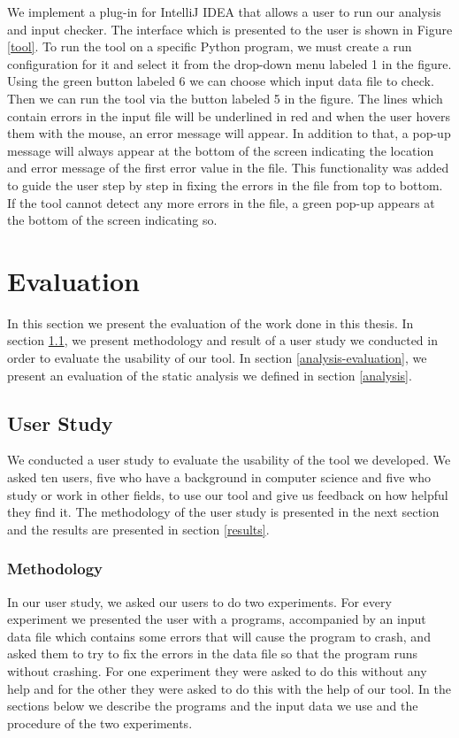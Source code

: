 \documentclass[10pt]{report}
\begin{document}
We implement a plug-in for IntelliJ IDEA that allows a user to run our analysis and input checker. The interface which is presented to the user is shown in Figure \ref{tool}. To run the tool on a specific Python program, we must create a run configuration for it and select it from the drop-down menu labeled 1 in the figure. Using the green button labeled 6 we can choose which input data file to check. Then we can run the tool via the button labeled 5 in the figure. The lines which contain errors in the input file will be underlined in red and when the user hovers them with the mouse, an error message will appear. In addition to that, a pop-up message will always appear at the bottom of the screen indicating the location and error message of the first error value in the file. This functionality was added to guide the user step by step in fixing the errors in the file from top to bottom. If the tool cannot detect any more errors in the file, a green pop-up appears at the bottom of the screen indicating so. 
  

\chapter{Evaluation}

In this section we present the evaluation of the work done in this thesis. In section \ref{user-study}, we present methodology and result of a user study we conducted in order to evaluate the usability of our tool. In section \ref{analysis-evaluation}, we present an evaluation of the static analysis we defined in section \ref{analysis}. 

\section{User Study} \label{user-study}
We conducted a user study to evaluate the usability of the tool we developed. We asked ten users, five who have a background in computer science and five who study or work in other fields, to use our tool and give us feedback on how helpful they find it. The methodology of the user study is presented in the next section and the results are presented in section \ref{results}. 

\subsection{Methodology} \label{methodology}

In our user study, we asked our users to do two experiments. For every experiment we presented the user with a programs, accompanied by an input data file which contains some errors that will cause the program to crash, and asked them to try to fix the errors in the data file so that the program runs without crashing. For one experiment they were asked to do this without any help and for the other they were asked to do this with the help of our tool. In the sections below we describe the programs and the input data we use and the procedure of the two experiments.
\end{document}
